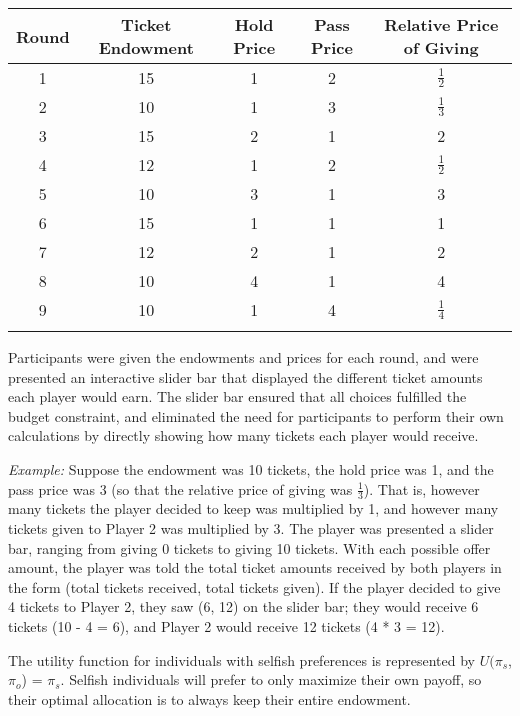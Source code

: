 \documentclass[12pt]{article}
\begin{document}
\begin{center}
\begin{tabular}{ c c c c c }
\hline \hline
 Round & Ticket Endowment & Hold Price & Pass Price & Relative Price of Giving \\ 
 \hline
1 & 15 & 1 & 2 & \(\frac{1}{2}\)  \\  
2 & 10 & 1 & 3 & \(\frac{1}{3}\)  \\  
3 & 15 & 2 & 1 & 2 \\  
4 & 12 & 1 & 2 & \(\frac{1}{2}\)  \\  
5 & 10 & 3 & 1 & 3  \\  
6 & 15 & 1 & 1 & 1  \\  
7 & 12 & 2 & 1 & 2 \\  
8 & 10 & 4 & 1 & 4 \\  
9 & 10 & 1 & 4 & \(\frac{1}{4}\)  \\ 
\hline \hline \\
\end{tabular}
\end{center}

Participants were given the endowments and prices for each round, and were presented an interactive slider bar that displayed the different ticket amounts each player would earn. The slider bar ensured that all choices fulfilled the budget constraint, and eliminated the need for participants to perform their own calculations by directly showing how many tickets each player would receive.

\textit{Example:} Suppose the endowment was 10 tickets, the hold price was 1, and the pass price was 3 (so that the relative price of giving was \(\frac{1}{3}\)). That is, however many tickets the player decided to keep was multiplied by 1, and however many tickets given to Player 2 was multiplied by 3. The player was presented a slider bar, ranging from giving 0 tickets to giving 10 tickets. With each possible offer amount, the player was told the total ticket amounts received by both players in the form (total tickets received, total tickets given). If the player decided to give 4 tickets to Player 2, they saw (6, 12) on the slider bar; they would receive 6 tickets (10 - 4 = 6), and Player 2 would receive 12 tickets (4 * 3 = 12).

The utility function for individuals with selfish preferences is represented by \(U(\pi_{s}\), \(\pi_{o}\)) = \(\pi_{s}\). Selfish individuals will prefer to only maximize their own payoff, so their optimal allocation is to always keep their entire endowment.
\end{document}
